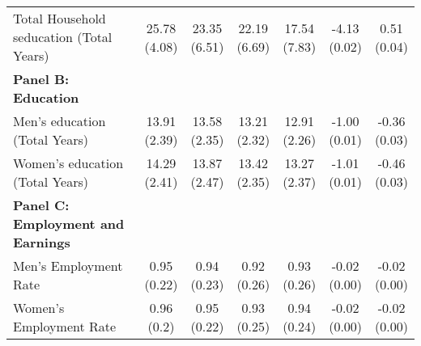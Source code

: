 \begin{table}[!h]
{\begin{threeparttable}
\begin{tabular}[t]{lcccccc}
\hspace{1em}Total Household seducation (Total Years) & \specialcell{25.78\\(4.08)} & \specialcell{23.35\\(6.51)} & \specialcell{22.19\\(6.69)} & \specialcell{17.54\\(7.83)} & \specialcell{-4.13\\(0.02)} & \specialcell{0.51\\(0.04)}\\
\textbf{Panel B: Education} & \textbf{} & \textbf{} & \textbf{} & \textbf{} & \textbf{} & \textbf{}\\
\addlinespace
\hspace{1em}Men’s education (Total Years) & \specialcell{13.91\\(2.39)} & \specialcell{13.58\\(2.35)} & \specialcell{13.21\\(2.32)} & \specialcell{12.91\\(2.26)} & \specialcell{-1.00\\(0.01)} & \specialcell{-0.36\\(0.03)}\\
\hspace{1em}Women’s education (Total Years) & \specialcell{14.29\\(2.41)} & \specialcell{13.87\\(2.47)} & \specialcell{13.42\\(2.35)} & \specialcell{13.27\\(2.37)} & \specialcell{-1.01\\(0.01)} & \specialcell{-0.46\\(0.03)}\\
\textbf{Panel C: Employment and Earnings} & \textbf{} & \textbf{} & \textbf{} & \textbf{} & \textbf{} & \textbf{}\\
\hspace{1em}Men’s Employment Rate & \specialcell{0.95\\(0.22)} & \specialcell{0.94\\(0.23)} & \specialcell{0.92\\(0.26)} & \specialcell{0.93\\(0.26)} & \specialcell{-0.02\\(0.00)} & \specialcell{-0.02\\(0.00)}\\
\hspace{1em}Women’s Employment Rate & \specialcell{0.96\\(0.2)} & \specialcell{0.95\\(0.22)} & \specialcell{0.93\\(0.25)} & \specialcell{0.94\\(0.24)} & \specialcell{-0.02\\(0.00)} & \specialcell{-0.02\\(0.00)}\\

\end{tabular}
\end{threeparttable}}
\end{table}
